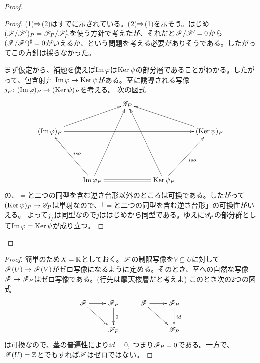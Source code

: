 \begin{proof}
  \begin{proof}
    (1)$\Rightarrow$(2)はすでに示されている。(2)$\Rightarrow$(1)を示そう。はじめ$(\mathscr{F} / \mathscr{F}')_P = \mathscr{F}_P / \mathscr{F}'_P$を使う方針で考えたが、それだと$\mathscr{F} / \mathscr{F}' = 0$から$(\mathscr{F} / \mathscr{F}')^{\sharp} = 0$がいえるか、という問題を考える必要がありそうである。したがってこの方針は採らなかった。

    まず仮定から、補題を使えば$\operatorname{Im} {\varphi}$は$\operatorname{Ker} \psi$の部分層であることがわかる。したがって、包含射$j \colon \operatorname{Im} {\varphi} \to \operatorname{Ker} \psi$がある。茎に誘導される写像$j_P \colon (\operatorname{Im} {\varphi})_P \to (\operatorname{Ker} \psi)_P$を考える。
  次の図式
  \[
  \xymatrix{
  {} & {} & \scrg_P & {} & { } \\
  (\Im \vp)_P \ar[urr] \ar[rrrr]  & {} & {} & {} & (\Ker \psi )_P \ar[llu] \\
  {} & {} & {} & {} & {} \\
  {} & \Im \vp_P \ar[luu]_-{iso} \ar@{=}[rr] \ar[uuur] &  { } & \Ker \psi_P \ar[luuu] \ar[uur]_-{iso}
   }
  \]
  の、$=$と二つの同型を含む逆さ台形以外のところは可換である。したがって$(\operatorname{Ker} \psi)_P \to \mathscr{G}_P$は単射なので、「$=$と二つの同型を含む逆さ台形」の可換性がいえる。
  よって$j_P$は同型なので$j$ははじめから同型である。ゆえに$\mathscr{G}_P$の部分群として$\operatorname{Im} {\varphi} = \operatorname{Ker} \psi$が成り立つ。
\end{proof}

\end{proof}



\begin{proof}
  簡単のため$X = {\mathbb R}$としておく。$\mathscr{F}$の制限写像を$V \subsetneq U$に対して$\mathscr{F}(U) \to \mathscr{F}(V)$がゼロ写像になるように定める。そのとき、茎への自然な写像$\mathscr{F} \to \mathscr{F}_P$はゼロ写像である。(行先は摩天楼層だと考えよ) このとき次の2つの図式
  \[
  \xymatrix{
\scrf \ar[r] \ar[dr] & \scrf_P \ar[d]^0 & \scrf \ar[r] \ar[rd] & \scrf_P  \ar[d]^{id} \\
{} & \scrf_P & {} & \scrf_P
  }
  \]
  は可換なので、茎の普遍性により$id = 0$, つまり$\mathscr{F}_P = 0$である。一方で、$\mathscr{F}(U) = {\mathbb Z}$とでもすれば$\mathscr{F}$はゼロではない。
\end{proof}


